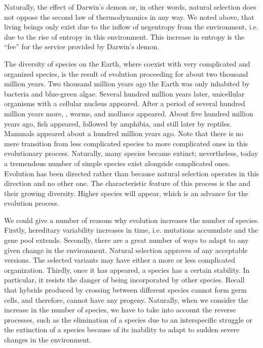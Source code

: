 Naturally, the effect of Darwin's demon or, in other words, natural selection does not oppose the second law of thermodynamics in any way. We noted above, that living beings only exist due to the inflow of negentropy from the environment, i.e. due to the rise of entropy in this environment. This increase in entropy is the ``fee'' for the service provided by Darwin's demon.


 The diversity of species on the Earth, where
 coexist with very complicated and organized species, is the
result of evolution proceeding for about two thousand million years. 
Two thousand million years ago the Earth was only inhabited by
bacteria and blue-green algae. Several hundred million years later,
unicellular organisms with a cellular nucleus appeared. After a period of
several hundred million years more, , worms, and molluscs appeared. About five hundred million years ago, fish appeared, followed by amphibia, and still later by reptiles. Mammals appeared about
a hundred million years ago. Note that there is no mere transition from
less complicated species to more complicated ones in this evolutionary
process. Naturally, many species became extinct; nevertheless, today
a tremendous number of simple species exist alongside complicated
ones. Evolution has been directed  rather than  because natural selection
operates in this direction and no other one. The characteristic feature of
this process is the  and their growing diversity. Higher species will appear, which is an advance for the
evolution process.

We could give a number of reasons why evolution increases the
number of species. Firstly, hereditary variability increases in time, i.e.
mutations accumulate and the gene pool extends. Secondly, there are
a great number of ways to adapt to any given change in the
environment. Natural selection approves of any acceptable versions. The
selected variants may have either a more or less complicated
organization. Thirdly, once it has appeared, a species has a certain
stability. In particular, it resists the danger of being incorporated by
other species. Recall that hybrids produced by crossing between different
species cannot form germ cells, and therefore, cannot have any progeny.
Naturally, when we consider the increase in the number of species, we
have to take into account the reverse processes, such as the elimination
of a species due to an interspecific struggle or the extinction of a species
because of its inability to adapt to sudden severe changes in the
environment.

